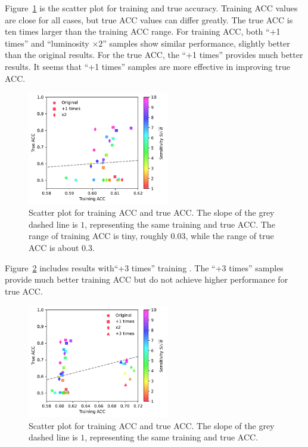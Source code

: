 \documentclass[12pt]{article}
\begin{document}
        Figure~\ref{fig:training_and_true_acc_ori_aug_1_x2} is the scatter plot for training and true accuracy. Training ACC values are close for all cases, but true ACC values can differ greatly. The true ACC is ten times larger than the training ACC range. For training ACC, both ``+1 times'' and ``luminosity $\times 2$'' samples show similar performance, slightly better than the original results. For the true ACC, the ``+1 times'' provides much better results. It seems that ``+1 times'' samples are more effective in improving true ACC.
        \begin{figure}[htpb]
            \centering
            \includegraphics[width=0.55\textwidth]{HVmodel_training_true_acc_aug_1_x2.pdf}
            \caption{Scatter plot for training ACC and true ACC. The slope of the grey dashed line is $1$, representing the same training and true ACC. The range of training ACC is tiny, roughly 0.03, while the range of true ACC is about 0.3.}
            \label{fig:training_and_true_acc_ori_aug_1_x2}
        \end{figure}

        Figure~\ref{fig:training_and_true_acc_ori_aug_1_3_x2} includes results with``+3 times'' training . The ``+3 times'' samples provide much better training ACC but do not achieve higher performance for true ACC.
        \begin{figure}[htpb]
            \centering
            \includegraphics[width=0.55\textwidth]{HVmodel_training_true_acc_aug_1_3_x2.pdf}
            \caption{Scatter plot for training ACC and true ACC. The slope of the grey dashed line is $1$, representing the same training and true ACC.}
            \label{fig:training_and_true_acc_ori_aug_1_3_x2}
        \end{figure}
\end{document}
